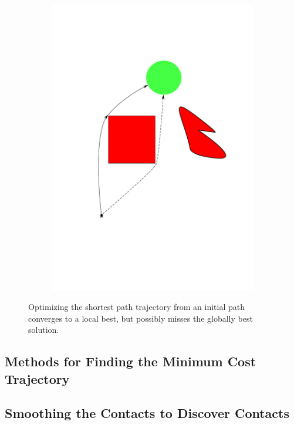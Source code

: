 \documentclass[../thesis.tex]{subfiles}
\begin{document}
\begin{figure}
\begin{subfigure}[b]{0.24\linewidth}
    \includegraphics[width=\linewidth]{./Planning/trajectory_best.pdf}    
  \end{subfigure}
  
  \caption{Optimizing the shortest path trajectory from an initial path converges to a local best, but possibly misses the globally best solution.}
  \label{fig:TrajectoryOptimization}
\end{figure}

\subsection{Methods for Finding the Minimum Cost Trajectory}
\subsection{Smoothing the Contacts to Discover Contacts}
\end{document}

